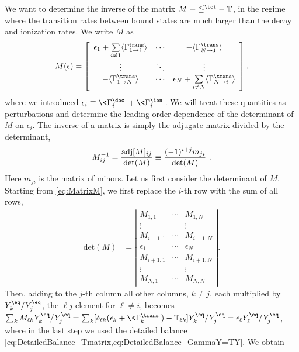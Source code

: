 \documentclass[preprint,5p,twocolumn]{elsarticle}
\begin{document}
We want to determine the inverse of the matrix $M\equiv\mathbb{\Gamma}^\tot - \mathbb{T}$, in the regime where the transition rates between bound states are much larger than the decay and ionization rates.  We write $M$ as
%
\begin{align}
M(\epsilon) = \left[ 
\begin{array}{ccc}
\epsilon_1 + \sum\limits_{i \neq 1} \langle \Gamma^{\text{trans}}_{1\rightarrow i}\rangle 
& \cdots 
&-\langle \Gamma^{\trans}_{N\rightarrow 1} \rangle 
\\
\vdots 
&\ddots 
&\vdots 
\\
-\langle \Gamma^{\trans}_{1\rightarrow N}\rangle
&\cdots 
&\epsilon_N+ \sum\limits_{i \neq N} \langle \Gamma^{\trans}_{N\rightarrow i}\rangle
\end{array}\right].
\label{eq:MatrixM}
\end{align}
%
where we introduced $\epsilon_i\equiv \<\Gamma^{\dec}_i\>+\<\Gamma_i^{\ion}\>$. 
We will treat these quantities as perturbations and determine the leading order dependence of the determinant of $M$ on $\epsilon_i$.  The inverse of a matrix is simply the adjugate matrix divided by the determinant,
%
\begin{equation}
M_{ij}^{-1}= \frac{{\rm adj}[M]_{ij}}{\det (M)} \equiv \frac{(-1)^{i+j}m_{ji}}{\det (M)} \ .
\end{equation}
%
Here $m_{ji}$ is the matrix of minors.
Let us first consider the determinant of $M$. Starting from \cref{eq:MatrixM}, we first replace the $i$-th row with the sum of all rows,
%
\begin{align}
\text{det}(M)&=
\left| 
\begin{array}{ccc}
M_{1,1}&\cdots&M_{1,N}\\
\vdots& &\vdots\\
M_{i-1,1}&\cdots&M_{i-1,N}\\
\epsilon_1&\cdots&\epsilon_N\\
M_{i+1,1}&\cdots&M_{i+1,N}\\
\vdots& &\vdots\\
M_{N,1}&\cdots&M_{N,N}
\end{array} \right| .
\end{align}
%
Then, adding to the $j$-th column all other columns, $k \neq j$, each multiplied by $Y_{k}^{\eq}/Y_j^{\eq}$, the $\ell j$ element for $\ell \ne i$, becomes 
$\sum_{k} M_{\ell k} Y_k^\eq/Y_j^\eq 
= \sum_k [\delta_{\ell k} (\epsilon_{k}+\<\Gamma_k^\trans\>) 
- \mathbb{T}_{\ell k}] Y_k^\eq/Y_j^\eq 
=\epsilon_{\ell} Y_\ell^\eq / Y_j^\eq$, where in the last step we used the detailed balance \cref{eq:DetailedBalance_Tmatrix,eq:DetailedBalance_GammaY=TY}. We obtain
\end{document}
